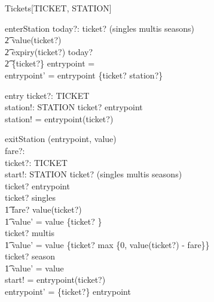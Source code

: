 \documentclass[11pt]{article}
\begin{document}
\begin{class}{Tickets[TICKET, STATION]}
\begin{op}{enterStation}
today?:  \nat  
\where
 ticket? \in (singles \cup multis \cup seasons) \land \\ 
\t2 value(ticket?)  \land \\ 
\t2 expiry(ticket?) \geq today? \land \\ 
\t2 \{ticket?\} \dres entrypoint = \emptyset \\ 
entrypoint' = entrypoint \cup \{ticket? \mapsto station?\} \\ 
\end{op} \classbreak 
\begin{op}{entry}
ticket?: TICKET \\ 
station!: STATION 
\where
 ticket? \in  \dom entrypoint \\ 
station! = entrypoint(ticket?) \\ 
\end{op} \classbreak 
\begin{op}{exitStation}
\Delta (entrypoint, value)\\
fare?:  \nat  \\ 
ticket?: TICKET \\ 
start!: STATION 
\where
 ticket? \in (singles \cup multis \cup seasons) \land \\ 
ticket? \in  \dom entrypoint \\ 
ticket? \in singles \implies\\
\t1 fare? \leq value(ticket?) \land \\ 
\t1 value' = value \oplus \{ticket? \}\\
ticket? \in multis \implies\\ 
\t1 value' = value \oplus \{ticket? \mapsto max \{0, value(ticket?) - fare\}\}\\ 
ticket? \in season \implies\\
\t1 value' = value\\
start! = entrypoint(ticket?) \\ 
entrypoint' = \{ticket?\} \ndres entrypoint
\end{op} 
\end{class} 
\end{document}
